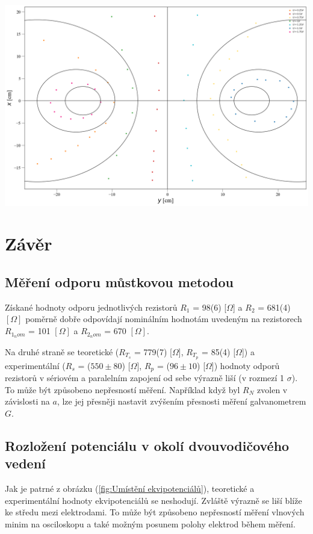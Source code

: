 \documentclass[a4paper,11pt]{article}
\begin{document}
    \begin{minipage}[t]{0.5\textwidth}
        \centering
            \includegraphics[scale=0.2]{equipotentials}
            \captionsetup{justification=centering, font=footnotesize}
            \label{fig:Umístění ekvipotenciálů}
        \raggedright
        \section{Závěr}
        \subsection{Měření odporu můstkovou metodou}
        Získané hodnoty odporu jednotlivých rezistorů $R_1$ = 98(6) [$\Omega$] a $R_2$ = 681(4) $[\Omega]$  poměrně dobře odpovídají nominálním hodnotám uvedeným na rezistorech $R_{1_nom}$ = 101 $[\Omega]$ a $R_{2_nom}$ = 670 $[\Omega]$.
        \par Na druhé straně se teoretické ($R_{T_s}$ = 779(7) [$\Omega$], $R_{T_p}$ = 85(4) [$\Omega$]) a experimentální ($R_s$ = ($550 \pm 80$) [$\Omega$], $R_p$ = ($96 \pm 10$) [$\Omega$]) hodnoty odporů rezistorů v sériovém a paralelním zapojení od sebe výrazně liší (v rozmezí 1 $\sigma$). To může být způsobeno nepřesností měření. Například když byl $R_N$ zvolen v závislosti na $a$, lze jej přesněji nastavit zvýšením přesnosti měření galvanometrem $G$.
    \subsection{Rozložení potenciálu v okolí dvouvodičového vedení} 
        Jak je patrné z obrázku (\ref{fig:Umístění ekvipotenciálů}), teoretické a experimentální hodnoty ekvipotenciálů se neshodují. Zvláště výrazně se liší blíže ke středu mezi elektrodami. To může být způsobeno nepřesností měření vlnových minim na osciloskopu a také možným posunem polohy elektrod během měření. 
    \end{minipage}
\end{document}
